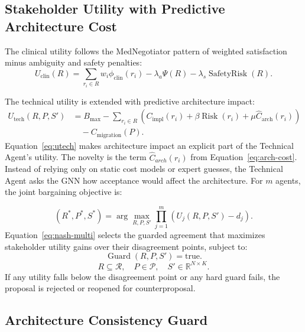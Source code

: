 \documentclass[english,preprint,nonatbib]{elsarticle}
\newcommand{\Rset}{\mathcal{R}}
\newcommand{\costarch}{\widehat{C}_{arch}}
\begin{document}
\subsection{Stakeholder Utility with Predictive Architecture Cost}

The clinical utility follows the MedNegotiator pattern of weighted satisfaction minus ambiguity and safety penalties:
\begin{equation}
U_{\mathrm{clin}}(R)
=
\sum_{r_i \in R}
w_i \phi_{\mathrm{clin}}(r_i)
-
\lambda_a \Psi(R)
-
\lambda_s \operatorname{SafetyRisk}(R).
\end{equation}

The technical utility is extended with predictive architecture impact:
\begin{equation}
\label{eq:utech}
\begin{aligned}
U_{\mathrm{tech}}(R,P,S')
&=
B_{\max}
-
\sum_{r_i \in R}
\left(
C_{\mathrm{impl}}(r_i)
+
\beta \operatorname{Risk}(r_i)
+
\mu \widehat{C}_{\mathrm{arch}}(r_i)
\right) \\
&\quad
-
C_{\mathrm{migration}}(P).
\end{aligned}
\end{equation}
Equation~\ref{eq:utech} makes architecture impact an explicit part of the Technical Agent's utility. The novelty is the term $\costarch(r_i)$ from Equation~\ref{eq:arch-cost}. Instead of relying only on static cost models or expert guesses, the Technical Agent asks the GNN how acceptance would affect the architecture.
For $m$ agents, the joint bargaining objective is:

\begin{equation}
\label{eq:nash-multi}
(R^{*},P^{*},S^{*})
=
\arg\max_{R,P,S'}
\prod_{j=1}^{m}
\left(
U_j(R,P,S') - d_j
\right).
\end{equation}
Equation~\ref{eq:nash-multi} selects the guarded agreement that maximizes stakeholder utility gains over their disagreement points, subject to:
\begin{equation}
\operatorname{Guard}(R,P,S') = \mathrm{true}.
\end{equation}
\begin{equation}
    R \subseteq \Rset, \quad P \in \mathcal{P}, \quad S' \in \mathbb{R}^{N\times K}.
\end{equation}
If any utility falls below the disagreement point or any hard guard fails, the proposal is rejected or reopened for counterproposal.

\subsection{Architecture Consistency Guard}
\end{document}
